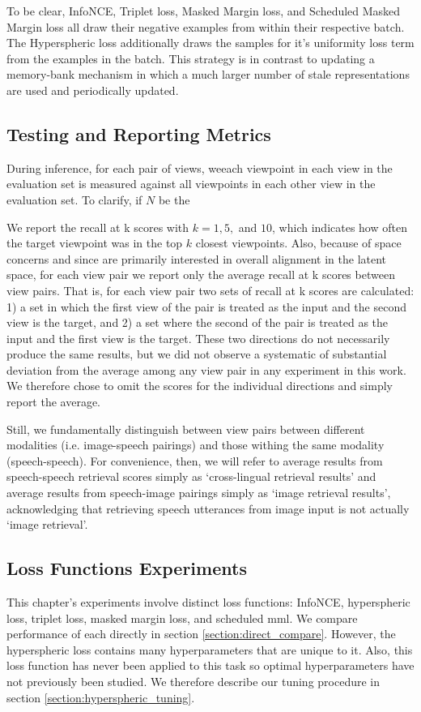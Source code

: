 To be clear, InfoNCE, Triplet loss, Masked Margin loss, and Scheduled Masked Margin loss all draw their negative examples from within their respective batch.
The Hyperspheric loss additionally draws the samples for it's uniformity loss term from the examples in the batch.
This strategy is in contrast to updating a memory-bank mechanism \citeme in which a much larger number of stale representations are used and periodically updated.


\subsection{Testing and Reporting Metrics}
\label{section:obj_exp_testing_rep}
During inference, for each pair of views, weeach viewpoint in each view in the evaluation set is measured against all viewpoints in each other view in the evaluation set.
To clarify, if $N$ be the

We report the recall at k scores with $k=1, 5,$ and $10$, which indicates how often the target viewpoint was in the top $k$ closest viewpoints.
Also, because of space concerns and since are primarily interested in overall alignment in the latent space, for each view pair we report only the average recall at k scores between view pairs.
That is, for each view pair two sets of recall at k scores are calculated: 1) a set in which the first view of the pair is treated as the input and the second view is the target, and 2) a set where the second of the pair is treated as the input and the first view is the target.
These two directions do not necessarily produce the same results, but we did not observe a systematic of substantial deviation from the average among any view pair in any experiment in this work.
We therefore chose to omit the scores for the individual directions and simply report the average.

Still, we fundamentally distinguish between view pairs between different modalities (i.e. image-speech pairings) and those withing the same modality (speech-speech).
For convenience, then, we will refer to average results from speech-speech retrieval scores simply as `cross-lingual retrieval results' and average results from speech-image pairings simply as `image retrieval results', acknowledging that retrieving speech utterances from image input is not actually `image retrieval'.

\subsection{Loss Functions Experiments}
This chapter's experiments involve  distinct loss functions: InfoNCE, hyperspheric loss, triplet loss, masked margin loss, and scheduled mml. 
We compare performance of each directly in section \ref{section:direct_compare}.
However, the hyperspheric loss contains many hyperparameters that are unique to it.
Also, this loss function has never been applied to this task so optimal hyperparameters have not previously been studied.
We therefore describe our tuning procedure in section \ref{section:hyperspheric_tuning}.

